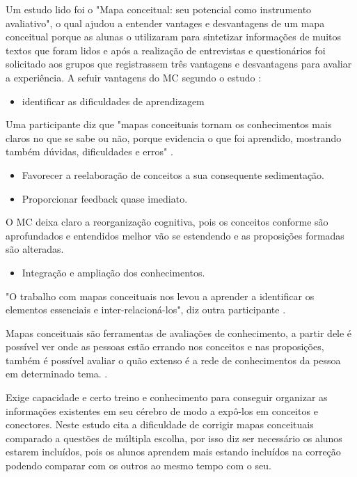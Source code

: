 Um estudo lido foi o "Mapa conceitual: seu potencial como instrumento avaliativo", o qual ajudou a entender vantages e desvantagens de um mapa conceitual porque as alunas o utilizaram para sintetizar informações de muitos textos que foram lidos e após a realização de entrevistas e questionários foi solicitado aos grupos que registrassem três vantagens e desvantagens para avaliar a experiência. A sefuir vantagens do MC segundo o estudo \cite{vantagensDesvantagensMC}: 

\begin{itemize}
\item identificar as dificuldades de aprendizagem
\end{itemize}
Uma participante diz que "mapas conceituais tornam os conhecimentos mais claros no que se sabe ou não, porque evidencia o que foi aprendido, mostrando também dúvidas, dificuldades e erros" \cite{vantagensDesvantagensMC}.


 \begin{itemize}
\item Favorecer a reelaboração de conceitos a sua consequente sedimentação.
\item Proporcionar feedback quase imediato.
\end{itemize}


 O MC deixa claro a reorganização cognitiva, pois os conceitos conforme são aprofundados e entendidos melhor vão se estendendo e as proposições formadas são alteradas.\cite{vantagensDesvantagensMC}


 \begin{itemize}
\item Integração e ampliação dos conhecimentos.
\end{itemize}
"O trabalho com mapas conceituais nos levou a aprender a identificar os elementos essenciais e inter-relacioná-los", diz outra participante \cite{vantagensDesvantagensMC}.

 Mapas conceituais são ferramentas de avaliações de conhecimento, a partir dele é possível ver onde as pessoas estão errando nos conceitos e nas proposições, também é possível avaliar o quão extenso é a rede de conhecimentos da pessoa em determinado tema. \cite{vantagensDesvantagensMC}.

 Exige capacidade e certo treino e conhecimento para conseguir organizar as informações existentes em seu cérebro de modo a expô-los em conceitos e conectores.
Neste estudo \cite{dificuldadesMapaConceitual} cita a dificuldade de corrigir mapas conceituais comparado a questões de múltipla escolha, por isso diz ser necessário os alunos estarem incluídos, pois os alunos aprendem mais estando incluídos na correção podendo comparar com os outros ao mesmo tempo com o seu.

